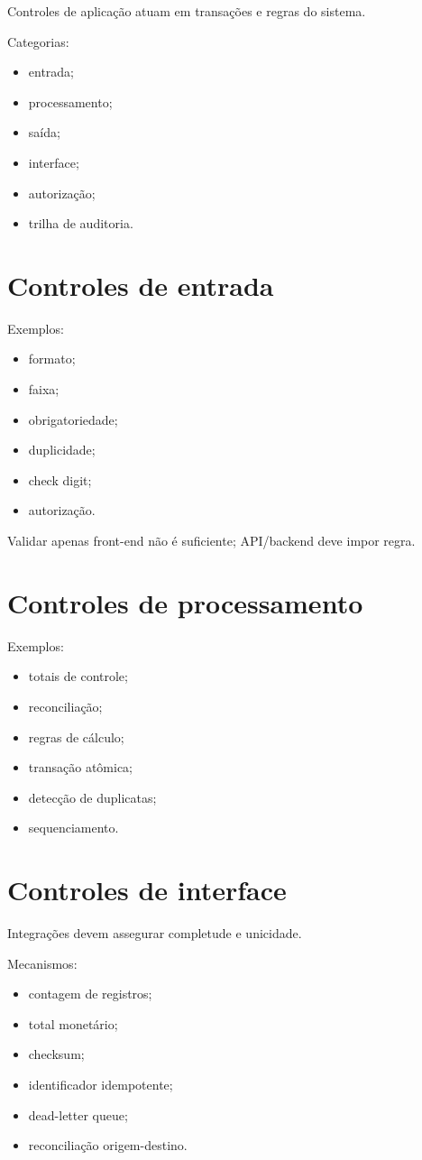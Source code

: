 Controles de aplicação atuam em transações e regras do sistema.

Categorias:
\begin{itemize}
\item entrada;
\item processamento;
\item saída;
\item interface;
\item autorização;
\item trilha de auditoria.
\end{itemize}

\section{Controles de entrada}

Exemplos:
\begin{itemize}
\item formato;
\item faixa;
\item obrigatoriedade;
\item duplicidade;
\item check digit;
\item autorização.
\end{itemize}

Validar apenas front-end não é suficiente; API/backend deve impor regra.

\section{Controles de processamento}

Exemplos:
\begin{itemize}
\item totais de controle;
\item reconciliação;
\item regras de cálculo;
\item transação atômica;
\item detecção de duplicatas;
\item sequenciamento.
\end{itemize}

\section{Controles de interface}

Integrações devem assegurar completude e unicidade.

Mecanismos:
\begin{itemize}
\item contagem de registros;
\item total monetário;
\item checksum;
\item identificador idempotente;
\item dead-letter queue;
\item reconciliação origem-destino.
\end{itemize}

